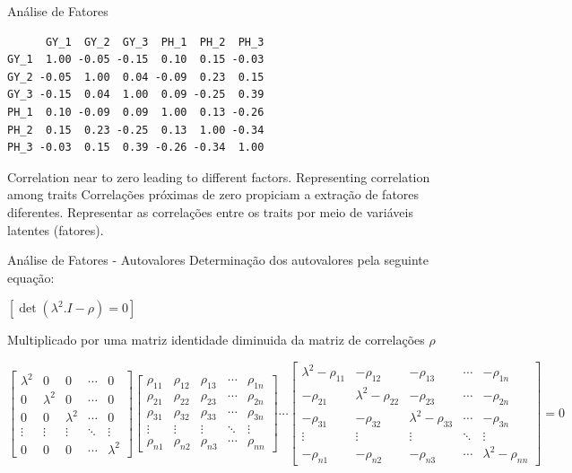 \documentclass[
  ignorenonframetext,
  aspectratio=169,
]{beamer}
\begin{document}
\begin{frame}[fragile]{Análise de Fatores}
\label{anuxe1lise-de-fatores}
\begin{verbatim}
      GY_1  GY_2  GY_3  PH_1  PH_2  PH_3
GY_1  1.00 -0.05 -0.15  0.10  0.15 -0.03
GY_2 -0.05  1.00  0.04 -0.09  0.23  0.15
GY_3 -0.15  0.04  1.00  0.09 -0.25  0.39
PH_1  0.10 -0.09  0.09  1.00  0.13 -0.26
PH_2  0.15  0.23 -0.25  0.13  1.00 -0.34
PH_3 -0.03  0.15  0.39 -0.26 -0.34  1.00
\end{verbatim}

Correlation near to zero leading to different factors. Representing
correlation among traits Correlações próximas de zero propiciam a
extração de fatores diferentes. Representar as correlações entre os
traits por meio de variáveis latentes (fatores).
\end{frame}

\begin{frame}{Análise de Fatores - Autovalores}
\label{anuxe1lise-de-fatores---autovalores}
Determinação dos autovalores pela seguinte equação:

\([\det(\lambda^2.I-\rho) = 0]\)

Multiplicado por uma matriz identidade diminuida da matriz de
correlações \(\rho\)

\[
\begin{bmatrix}
\lambda^2 & 0 & 0 & \cdots & 0 \\
0 & \lambda^2 & 0 & \cdots & 0 \\
0 & 0 & \lambda^2 & \cdots & 0 \\
\vdots & \vdots & \vdots & \ddots & \vdots \\
0 & 0 & 0 & \cdots & \lambda^2
\end{bmatrix}
  \begin{bmatrix}
    \rho_{11} & \rho_{12} & \rho_{13} & \cdots & \rho_{1n} \\
    \rho_{21} & \rho_{22} & \rho_{23} & \cdots & \rho_{2n} \\
    \rho_{31} & \rho_{32} & \rho_{33} & \cdots & \rho_{3n} \\
    \vdots    & \vdots    & \vdots    & \ddots & \vdots   \\
    \rho_{n1} & \rho_{n2} & \rho_{n3} & \cdots & \rho_{nn}
    \end{bmatrix}\cdots
\begin{bmatrix}
\lambda^2 - \rho_{11} & -\rho_{12} & -\rho_{13} & \cdots & -\rho_{1n} \\
-\rho_{21} & \lambda^2 - \rho_{22} & -\rho_{23} & \cdots & -\rho_{2n} \\
-\rho_{31} & -\rho_{32} & \lambda^2 - \rho_{33} & \cdots & -\rho_{3n} \\
\vdots     & \vdots     & \vdots     & \ddots & \vdots   \\
-\rho_{n1} & -\rho_{n2} & -\rho_{n3} & \cdots & \lambda^2 - \rho_{nn}
\end{bmatrix}= 0
\]
\end{frame}
\end{document}
